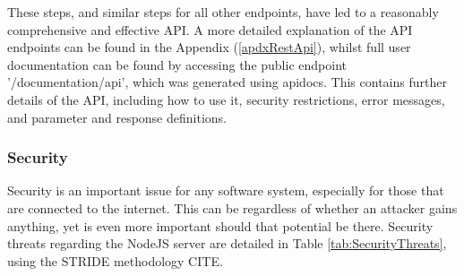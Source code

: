 \documentclass{article}
\begin{document}
These steps, and similar steps for all other endpoints, have led to a reasonably comprehensive and effective API. A more detailed explanation of the API endpoints can be found in the Appendix (\ref{apdxRestApi}), whilst full user documentation can be found by accessing the public endpoint '/documentation/api', which was generated using apidocs\cite{apidocs}. This contains further details of the API, including how to use it, security restrictions, error messages, and parameter and response definitions.

\subsubsection{Security}
Security is an important issue for any software system, especially for those that are connected to the internet. This can be regardless of whether an attacker gains anything, yet is even more important should that potential be there. Security threats regarding the NodeJS server are detailed in Table \ref{tab:SecurityThreats}, using the STRIDE methodology CITE.
\end{document}

